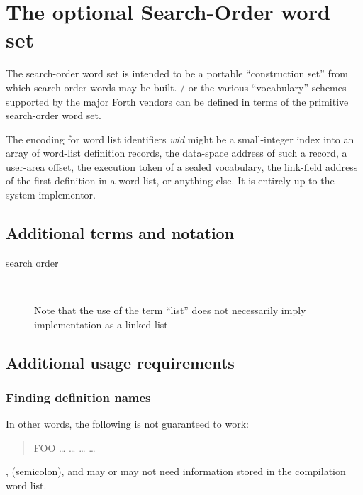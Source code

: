
\section{The optional Search-Order word set} %
\label{rat:search}

The search-order word set is intended to be a portable ``construction
set'' from which search-order words may be built.  /
or the various ``vocabulary'' schemes supported by the major Forth
vendors can be defined in terms of the primitive search-order word set.

The encoding for word list identifiers \emph{wid} might be a
small-integer index into an array of word-list definition records, the
data-space address of such a record, a user-area offset, the execution
token of a sealed vocabulary, the link-field address of the first definition
in a word list, or anything else. It is entirely up to the system implementor.

\setcounter{subsection}{1}
\subsection{Additional terms and notation} %

\begin{description}
\item[search order] ~

	Note that the use of the term ``list'' does not necessarily
	imply implementation as a linked list
\end{description}

\subsection{Additional usage requirements} %

\setcounter{subsubsection}{2}
\subsubsection{Finding definition names} %

In other words, the following is not guaranteed to work:

\begin{quote}\ttfamily
	\word{:} FOO {\ldots}
		\word{[} {\ldots}  \word{]}
		{\ldots}  {\ldots} \\
	\word{;} 
\end{quote}
, \word{;} (semicolon), and  may
or may not need information stored in the compilation word list.

